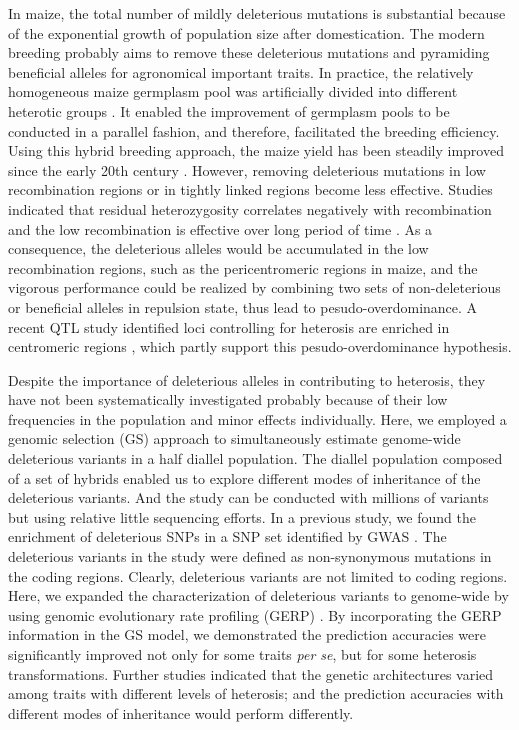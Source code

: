 \documentclass[9pt,twocolumn,twoside]{gsajnl}
\begin{document}
In maize, the total number of mildly deleterious mutations is substantial because of the exponential growth of population size after domestication. The modern breeding probably aims to remove these deleterious mutations and pyramiding beneficial alleles for agronomical important traits. In practice, the relatively homogeneous maize germplasm pool was artificially divided into different heterotic groups \citep{Heerwaarden2012}. It enabled the improvement of germplasm pools to be conducted in a parallel fashion, and therefore, facilitated the breeding efficiency. Using this hybrid breeding approach, the maize yield has been steadily improved since the early 20th century \citep{duvick2001biotechnology}. However, removing deleterious mutations in low recombination regions or in tightly linked regions become less effective. Studies indicated that residual heterozygosity correlates negatively with recombination \citep{Gore2009, McMullen2009} and the low recombination is effective over long period of time \citep{Haddrill2007}. As a consequence, the deleterious alleles would be accumulated in the low recombination regions, such as the pericentromeric regions in maize, and the vigorous performance could be realized by combining two sets of non-deleterious or beneficial alleles in repulsion state, thus lead to pesudo-overdominance. A recent QTL study identified loci controlling for heterosis are enriched in centromeric regions \citep{Lariepe2012}, which partly support this pesudo-overdominance hypothesis.

Despite the importance of deleterious alleles in contributing to heterosis, they have not been systematically investigated probably because of their low frequencies in the population and minor effects individually. Here, we employed a genomic selection (GS) approach to simultaneously estimate genome-wide deleterious variants in a half diallel population. The diallel population composed of a set of hybrids enabled us to explore different modes of inheritance of the deleterious variants. And the study can be conducted with millions of variants but using relative little sequencing efforts. In a previous study, we found the enrichment of deleterious SNPs in a SNP set identified by GWAS \citep{Mezmouk2014}. The deleterious variants in the study were defined as non-synonymous mutations in the coding regions. Clearly, deleterious variants are not limited to coding regions. Here, we expanded the characterization of deleterious variants to genome-wide by using genomic evolutionary rate profiling (GERP) \citep{Cooper2005}. By incorporating the GERP information in the GS model, we demonstrated the prediction accuracies were significantly improved not only for some traits \emph{per se}, but for some heterosis transformations. Further studies indicated that the genetic architectures varied among traits with different levels of heterosis; and the prediction accuracies with different modes of inheritance would perform differently.
\end{document}
